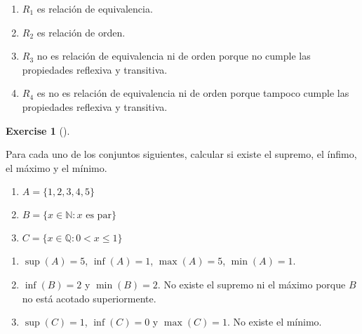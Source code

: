 \documentclass[
  letterpaper,
  DIV=11,
  numbers=noendperiod]{scrreport}
\providecommand{\tightlist}{%
  \setlength{\itemsep}{0pt}\setlength{\parskip}{0pt}}\usepackage{longtable,booktabs,array}
\theoremstyle{definition}
\newtheorem{exercise}{Exercise}[chapter]
\theoremstyle{remark}
\begin{document}
\begin{tcolorbox}[enhanced jigsaw, bottomtitle=1mm, opacityback=0, coltitle=black, toprule=.15mm, colback=white, titlerule=0mm, rightrule=.15mm, title=\textcolor{quarto-callout-tip-color}{\faLightbulb}\hspace{0.5em}{Solución}, breakable, bottomrule=.15mm, colbacktitle=quarto-callout-tip-color!10!white, toptitle=1mm, opacitybacktitle=0.6, left=2mm, leftrule=.75mm, colframe=quarto-callout-tip-color-frame, arc=.35mm]

\begin{enumerate}
\def\labelenumi{\alph{enumi}.}
\tightlist
\item
  \(R_1\) es relación de equivalencia.
\item
  \(R_2\) es relación de orden.
\item
  \(R_3\) no es relación de equivalencia ni de orden porque no cumple
  las propiedades reflexiva y transitiva.
\item
  \(R_4\) es no es relación de equivalencia ni de orden porque tampoco
  cumple las propiedades reflexiva y transitiva.
\end{enumerate}

\end{tcolorbox}

\leavevmode{}%
\begin{exercise}[]\label{exr-7}

Para cada uno de los conjuntos siguientes, calcular si existe el
supremo, el ínfimo, el máximo y el mínimo.

\begin{enumerate}
\def\labelenumi{\alph{enumi}.}
\tightlist
\item
  \(A=\{1, 2, 3, 4, 5\}\)
\item
  \(B=\{x\in\mathbb{N} : x \mbox{ es par}\}\)
\item
  \(C=\{x\in\mathbb{Q} : 0< x \leq 1\}\)
\end{enumerate}

\end{exercise}

\begin{tcolorbox}[enhanced jigsaw, bottomtitle=1mm, opacityback=0, coltitle=black, toprule=.15mm, colback=white, titlerule=0mm, rightrule=.15mm, title=\textcolor{quarto-callout-tip-color}{\faLightbulb}\hspace{0.5em}{Solución}, breakable, bottomrule=.15mm, colbacktitle=quarto-callout-tip-color!10!white, toptitle=1mm, opacitybacktitle=0.6, left=2mm, leftrule=.75mm, colframe=quarto-callout-tip-color-frame, arc=.35mm]

\begin{enumerate}
\def\labelenumi{\alph{enumi}.}
\tightlist
\item
  \(\sup(A)=5\), \(\inf(A) = 1\), \(\max(A)=5\), \(\min(A)=1\).
\item
  \(\inf(B) = 2\) y \(\min(B)=2\). No existe el supremo ni el máximo
  porque \(B\) no está acotado superiormente.
\item
  \(\sup(C)=1\), \(\inf(C) = 0\) y \(\max(C)=1\). No existe el mínimo.
\end{enumerate}

\end{tcolorbox}
\end{document}
